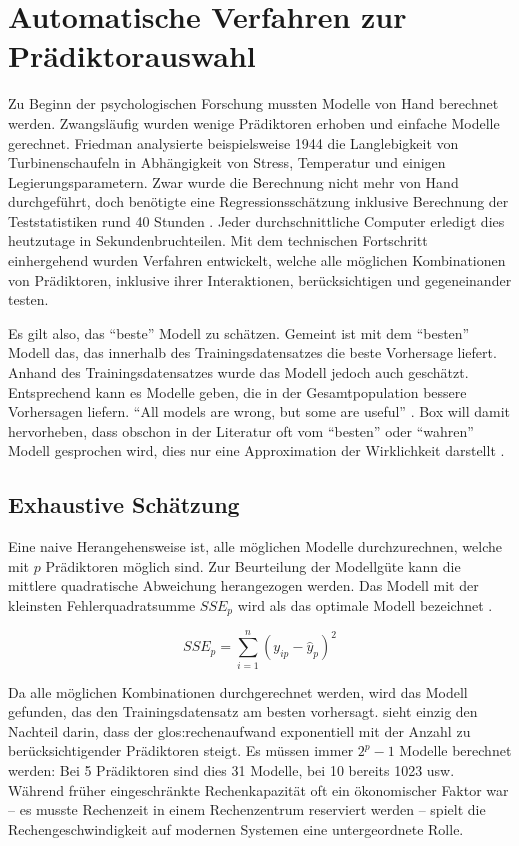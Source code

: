 \section{Automatische Verfahren zur Prädiktorauswahl}
Zu Beginn der psychologischen Forschung mussten Modelle von Hand berechnet werden. Zwangsläufig wurden wenige Prädiktoren erhoben und einfache Modelle gerechnet. 
Friedman analysierte beispielsweise 1944 die Langlebigkeit von Turbinenschaufeln in Abhängigkeit von Stress, Temperatur und einigen Legierungsparametern. 
Zwar wurde die Berechnung nicht mehr von Hand durchgeführt, doch benötigte eine Regressionsschätzung inklusive Berechnung der Teststatistiken rund 40 Stunden \cite[p.2]{armstrong2011illusions}. Jeder durchschnittliche Computer erledigt dies heutzutage in Sekundenbruchteilen. 
Mit dem technischen Fortschritt einhergehend wurden Verfahren entwickelt, welche alle möglichen Kombinationen von Prädiktoren, inklusive ihrer Interaktionen, berücksichtigen und gegeneinander testen.

Es gilt also, das ``beste'' Modell zu schätzen. 
Gemeint ist mit dem ``besten'' Modell das, das innerhalb des Trainingsdatensatzes die beste Vorhersage liefert. 
Anhand des Trainingsdatensatzes wurde das Modell jedoch auch geschätzt. Entsprechend kann es Modelle geben, die in der Gesamtpopulation bessere Vorhersagen liefern. 
``All models are wrong, but some are useful'' \cite[p.424]{box1979robustness}.
Box will damit hervorheben, dass obschon in der Literatur oft vom ``besten'' oder ``wahren'' Modell gesprochen wird, dies nur eine Approximation der Wirklichkeit darstellt \cite[p.172]{weakliem2004introduction}.

\subsection{Exhaustive Schätzung}
Eine naive Herangehensweise ist, alle möglichen Modelle durchzurechnen, welche mit $p$ Prädiktoren möglich sind. 
Zur Beurteilung der Modellgüte kann die mittlere quadratische Abweichung herangezogen werden.
Das Modell mit der kleinsten Fehlerquadratsumme $SSE_p$ wird als das  optimale Modell bezeichnet \cite[p. 6]{thompson1978selection}. 

\begin{equation}
SSE_p = \sum_{i=1}^n(y_{ip}-\hat y_{p})^2
\tag{Fehlerquadratsumme}
\end{equation}


Da alle möglichen Kombinationen durchgerechnet werden, wird das  Modell gefunden, das den Trainingsdatensatz am besten vorhersagt.
 sieht einzig den Nachteil darin, dass der \Gls{glos:rechenaufwand} exponentiell mit der Anzahl zu berücksichtigender Prädiktoren steigt. 
Es müssen immer $2^p-1$ Modelle berechnet werden: Bei 5 Prädiktoren sind dies 31 Modelle, bei 10 bereits 1023 usw.
Während früher eingeschränkte Rechenkapazität oft ein ökonomischer Faktor war -- es musste Rechenzeit in einem Rechenzentrum reserviert werden -- spielt die Rechengeschwindigkeit auf modernen Systemen eine untergeordnete Rolle. 

